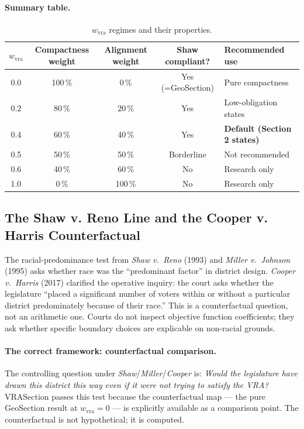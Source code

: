 \paragraph{Summary table.}
\begin{table}[h]
\centering
\caption{$w_\text{vra}$ regimes and their properties.}
\label{tab:wvra}
\begin{tabular}{ccccl}
\toprule
$w_\text{vra}$ & \textbf{Compactness weight} & \textbf{Alignment weight}
  & \textbf{Shaw compliant?} & \textbf{Recommended use} \\
\midrule
0.0  & 100\,\% & 0\,\%   & Yes (=GeoSection)  & Pure compactness \\
0.2  & 80\,\%  & 20\,\%  & Yes                & Low-obligation states \\
0.4  & 60\,\%  & 40\,\%  & Yes                & \textbf{Default (Section 2 states)} \\
0.5  & 50\,\%  & 50\,\%  & Borderline         & Not recommended \\
0.6  & 40\,\%  & 60\,\%  & No                 & Research only \\
1.0  & 0\,\%   & 100\,\% & No                 & Research only \\
\bottomrule
\end{tabular}
\end{table}

\subsection{The Shaw v. Reno Line and the Cooper v. Harris Counterfactual}
\label{sec:shaw-line}

The racial-predominance test from \emph{Shaw v.\ Reno} (1993) and
\emph{Miller v.\ Johnson} (1995) asks whether race was the ``predominant
factor'' in district design.
\emph{Cooper v.\ Harris} (2017) clarified the operative inquiry: the court
asks whether the legislature ``placed a significant number of voters within
or without a particular district predominately because of their race.''
This is a counterfactual question, not an arithmetic one.
Courts do not inspect objective function coefficients; they ask whether
specific boundary choices are explicable on non-racial grounds.

\paragraph{The correct framework: counterfactual comparison.}
The controlling question under \emph{Shaw}/\emph{Miller}/\emph{Cooper} is:
\emph{Would the legislature have drawn this district this way even if it
were not trying to satisfy the VRA?}
VRASection passes this test because the counterfactual map --- the pure
GeoSection result at $w_\text{vra} = 0$ --- is explicitly available as a
comparison point.
The counterfactual is not hypothetical; it is computed.

